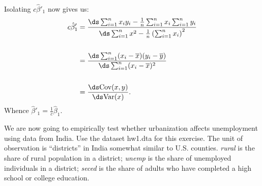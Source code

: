 \documentclass[11pt,twoside,openany]{memoir}
\begin{document}
\begin{answer}
\begin{equation*}
\begin{split}
                \end{split}
                \end{equation*}
            Isolating $c \hat{\beta}'_1$ now gives us:
                \begin{equation*}
                \begin{split}
                    c\hat{\beta}'_1 &= \frac{\ds\sum_{i = 1}^n x_i y_i - \frac{1}{n}\sum_{i=1}^n x_i \sum_{i = 1}^n y_i}{\ds\sum_{i = 1}^n x^2 - \frac{1}{n} \left( \sum_{i = 1}^n x_i \right)^2} \\
                    &\phantom{=} \\
                    & = \frac{\ds \sum_{i = 1}^n(x_i - \overline{x})(y_i - \overline{y})}{\ds\sum_{i = 1}^n (x_i - \overline{x})^2} \\
                    &\phantom{=}\\
                    & = \frac{\ds\text{Cov}(x,y)}{\ds\text{Var}(x)}.
                \end{split}
                \end{equation*}
            Whence $\hat{\beta}'_1 = \frac{1}{c}\hat{\beta}_1$.
        \end{answer}
    \begin{question}
        We are now going to empirically test whether urbanization affects unemployment using data from India. Use the dataset hw1.dta for this exercise. The unit of observation is “districts” in India \textemdash somewhat similar to U.S. counties. \textit{rural} is the share of rural population in a district; \textit{unemp} is the share of unemployed individuals in a district; \textit{seced} is the share of adults who have completed a high school or college education.
    \end{question}
\end{document}
